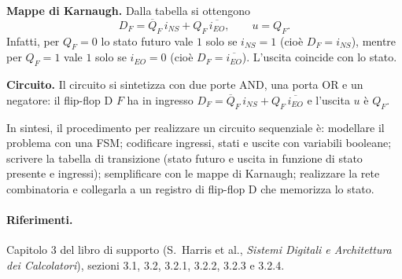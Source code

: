 \documentclass[11pt,a4paper]{article}
\begin{document}
\begin{esempio}
\textbf{Mappe di Karnaugh.} Dalla tabella si ottengono
\[
D_F = \overline{Q}_F\, i_{NS} + Q_F\, \overline{i_{EO}}, \qquad u = Q_F .
\]
Infatti, per $Q_F = 0$ lo stato futuro vale $1$ solo se $i_{NS} = 1$ (cioè $D_F = i_{NS}$), mentre per $Q_F = 1$ vale $1$ solo se $i_{EO} = 0$ (cioè $D_F = \overline{i_{EO}}$). L'uscita coincide con lo stato.

\textbf{Circuito.} Il circuito si sintetizza con due porte AND, una porta OR e un negatore: il flip-flop D $F$ ha in ingresso $D_F = \overline{Q}_F\, i_{NS} + Q_F\, \overline{i_{EO}}$ e l'uscita $u$ è $Q_F$.

\begin{center}
\end{center}
\end{esempio}

\begin{osservazione}
In sintesi, il procedimento per realizzare un circuito sequenziale è: modellare il problema con una FSM; codificare ingressi, stati e uscite con variabili booleane; scrivere la tabella di transizione (stato futuro e uscita in funzione di stato presente e ingressi); semplificare con le mappe di Karnaugh; realizzare la rete combinatoria e collegarla a un registro di flip-flop D che memorizza lo stato.
\end{osservazione}

\paragraph{Riferimenti.} Capitolo 3 del libro di supporto (S.\ Harris et al., \emph{Sistemi Digitali e Architettura dei Calcolatori}), sezioni 3.1, 3.2, 3.2.1, 3.2.2, 3.2.3 e 3.2.4.
\end{document}
